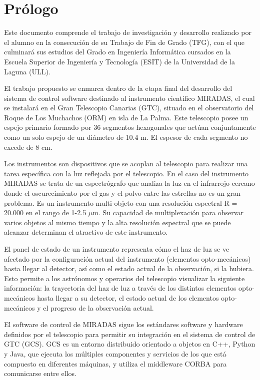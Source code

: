 %
%

\chapter*{Prólogo}

Este documento comprende el trabajo de investigación y desarrollo realizado por el alumno en la consecución de su Trabajo de Fin de Grado (TFG), con el que culminará sus estudios del Grado en Ingeniería Informática cursados en la Escuela Superior de Ingeniería y Tecnología (ESIT) de la Universidad de la Laguna (ULL).

El trabajo propuesto se enmarca dentro de la etapa final del desarrollo del sistema de control software destinado al instrumento científico MIRADAS, el cual se instalará en el Gran Telescopio Canarias (GTC), situado en el observatorio del Roque de Los Muchachos (ORM) en isla de La Palma. Este telescopio posee un espejo primario formado por 36 segmentos hexagonales que actúan conjuntamente como un solo espejo de un diámetro de 10.4 m. El espesor de cada segmento no excede de 8 cm.

Los instrumentos son dispositivos que se acoplan al telescopio para realizar una tarea específica con la luz reflejada por el telescopio. En el caso del instrumento MIRADAS se trata de un espectrógrafo que analiza la luz en el infrarrojo cercano donde el oscurecimiento por el gas y el polvo entre las estrellas no es un gran problema. Es un instrumento multi-objeto con una resolución espectral R = 20.000 en el rango de 1-2.5 $\mu$m. Su capacidad de multiplexación para observar varios objetos al mismo tiempo y la alta resolución espectral que se puede alcanzar determinan el atractivo de este instrumento.

El panel de estado de un instrumento representa cómo el haz de luz se ve afectado por la configuración actual del instrumento (elementos opto-mecánicos) hasta llegar al detector, así como el estado actual de la observación, si la hubiera. Esto permite a los astrónomos y operarios del telescopio visualizar la siguiente información: la trayectoria del haz de luz a través de los distintos elementos opto-mecánicos hasta llegar a su detector, el estado actual de los elementos opto-mecánicos y el progreso de la observación actual.

El software de control de MIRADAS sigue los estándares software y hardware definidos por el telescopio para permitir su integración en el sistema de control de GTC (GCS). GCS es un entorno distribuido orientado a objetos en C++, Python y Java, que ejecuta los múltiples componentes y servicios de los que está compuesto en diferentes máquinas, y utiliza el middleware CORBA para comunicarse entre ellos.
